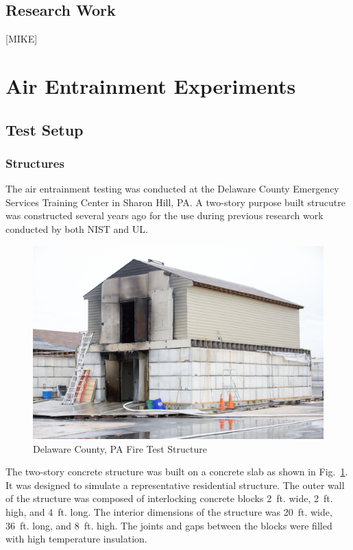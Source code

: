 \documentclass{article}
\begin{document}
\subsection{Research Work}

[MIKE]

\clearpage

\section{Air Entrainment Experiments}

\subsection{Test Setup}

\subsubsection{Structures}

The air entrainment testing was conducted at the Delaware County Emergency Services Training Center in Sharon Hill, PA. A two-story purpose built strucutre was constructed several years ago for the use during previous research work conducted by both NIST and UL.

\begin{figure}[!ht]
	\centering
	\includegraphics[width=6in]{Figures/Air_Entrainment/delcocorner.jpg}
	\caption{Delaware County, PA Fire Test Structure}
	\label{fig:Delaware_County,_PA_Fire_Test_Structure}
\end{figure}

The two-story concrete structure was built on a concrete slab as shown in Fig.~\ref{fig:Delaware_County,_PA_Fire_Test_Structure}. It was designed to simulate a representative residential structure. The outer wall of the structure was composed of interlocking concrete blocks 2~ft. wide, 2~ft. high, and 4~ft. long. The interior dimensions of the structure was 20~ft. wide, 36~ft. long, and 8~ft. high. The joints and gaps between the blocks were filled with high temperature insulation.
\end{document}
